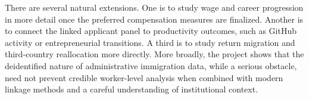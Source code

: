 There are several natural extensions. One is to study wage and career progression in more detail once the preferred compensation measures are finalized. Another is to connect the linked applicant panel to productivity outcomes, such as GitHub activity or entrepreneurial transitions. A third is to study return migration and third-country reallocation more directly. More broadly, the project shows that the deidentified nature of administrative immigration data, while a serious obstacle, need not prevent credible worker-level analysis when combined with modern linkage methods and a careful understanding of institutional context.

